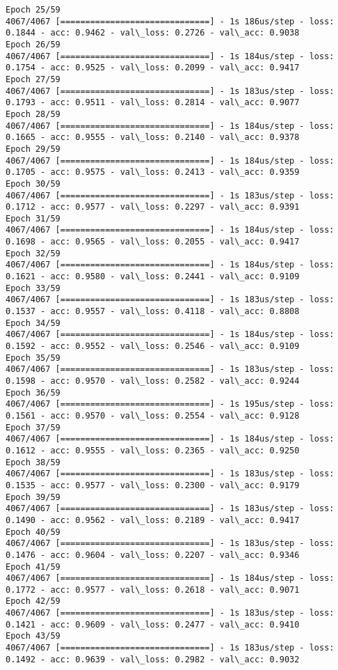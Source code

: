 \documentclass[11pt]{article}
\begin{document}
\begin{Verbatim}[commandchars=\\\{\}]
Epoch 25/59
4067/4067 [==============================] - 1s 186us/step - loss: 0.1844 - acc: 0.9462 - val\_loss: 0.2726 - val\_acc: 0.9038
Epoch 26/59
4067/4067 [==============================] - 1s 184us/step - loss: 0.1754 - acc: 0.9525 - val\_loss: 0.2099 - val\_acc: 0.9417
Epoch 27/59
4067/4067 [==============================] - 1s 183us/step - loss: 0.1793 - acc: 0.9511 - val\_loss: 0.2814 - val\_acc: 0.9077
Epoch 28/59
4067/4067 [==============================] - 1s 184us/step - loss: 0.1665 - acc: 0.9555 - val\_loss: 0.2140 - val\_acc: 0.9378
Epoch 29/59
4067/4067 [==============================] - 1s 184us/step - loss: 0.1705 - acc: 0.9575 - val\_loss: 0.2413 - val\_acc: 0.9359
Epoch 30/59
4067/4067 [==============================] - 1s 183us/step - loss: 0.1712 - acc: 0.9577 - val\_loss: 0.2297 - val\_acc: 0.9391
Epoch 31/59
4067/4067 [==============================] - 1s 184us/step - loss: 0.1698 - acc: 0.9565 - val\_loss: 0.2055 - val\_acc: 0.9417
Epoch 32/59
4067/4067 [==============================] - 1s 184us/step - loss: 0.1621 - acc: 0.9580 - val\_loss: 0.2441 - val\_acc: 0.9109
Epoch 33/59
4067/4067 [==============================] - 1s 183us/step - loss: 0.1537 - acc: 0.9557 - val\_loss: 0.4118 - val\_acc: 0.8808
Epoch 34/59
4067/4067 [==============================] - 1s 184us/step - loss: 0.1592 - acc: 0.9552 - val\_loss: 0.2546 - val\_acc: 0.9109
Epoch 35/59
4067/4067 [==============================] - 1s 183us/step - loss: 0.1598 - acc: 0.9570 - val\_loss: 0.2582 - val\_acc: 0.9244
Epoch 36/59
4067/4067 [==============================] - 1s 195us/step - loss: 0.1561 - acc: 0.9570 - val\_loss: 0.2554 - val\_acc: 0.9128
Epoch 37/59
4067/4067 [==============================] - 1s 184us/step - loss: 0.1612 - acc: 0.9555 - val\_loss: 0.2365 - val\_acc: 0.9250
Epoch 38/59
4067/4067 [==============================] - 1s 183us/step - loss: 0.1535 - acc: 0.9577 - val\_loss: 0.2300 - val\_acc: 0.9179
Epoch 39/59
4067/4067 [==============================] - 1s 183us/step - loss: 0.1490 - acc: 0.9562 - val\_loss: 0.2189 - val\_acc: 0.9417
Epoch 40/59
4067/4067 [==============================] - 1s 183us/step - loss: 0.1476 - acc: 0.9604 - val\_loss: 0.2207 - val\_acc: 0.9346
Epoch 41/59
4067/4067 [==============================] - 1s 184us/step - loss: 0.1772 - acc: 0.9577 - val\_loss: 0.2618 - val\_acc: 0.9071
Epoch 42/59
4067/4067 [==============================] - 1s 183us/step - loss: 0.1421 - acc: 0.9609 - val\_loss: 0.2477 - val\_acc: 0.9410
Epoch 43/59
4067/4067 [==============================] - 1s 183us/step - loss: 0.1492 - acc: 0.9639 - val\_loss: 0.2982 - val\_acc: 0.9032

\end{Verbatim}
\end{document}
